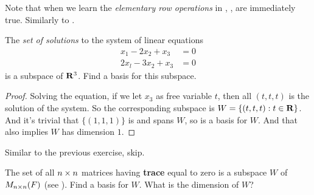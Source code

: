 \begin{note}
\TODOREF{} Note that when we learn the \emph{elementary row operations} in , ,  are immediately true.
Similarly to .
\end{note}

\begin{exercise} \label{exercise 1.6.13}
The \emph{set of solutions} to the system of linear equations
\begin{align*}
       x_1 - 2x_2 + x_3 & = 0 \\
      2x_l - 3x_2 + x_3 & = 0
\end{align*}
is a subspace of \(\mathbf{R}^3\).
Find a basis for this subspace.
\end{exercise}

\begin{proof}
Solving the equation, if we let \(x_3\) as free variable \(t\), then all \((t, t, t)\) is the solution of the system.
So the corresponding subspace is \(W = \{ (t, t, t) : t \in \mathbf{R} \}\).
And it's trivial that \(\{ (1, 1, 1) \}\) is \LID{} and spans \(W\), so is a basis for \(W\).
And that also implies \(W\) has dimension \(1\).
\end{proof}

\begin{exercise} \label{exercise 1.6.14}
Similar to the previous exercise, skip.
\end{exercise}

\begin{exercise} \label{exercise 1.6.15}
The set of all \(n \times n\) matrices having \textbf{trace} equal to zero is a subspace \(W\) of \(M_{n \times n}(F)\) (see ).
Find a basis for \(W\).
What is the dimension of \(W\)?
\end{exercise}

